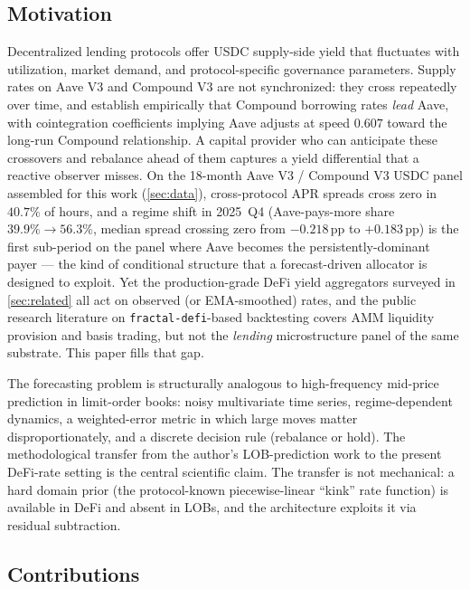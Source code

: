 \documentclass[11pt,a4paper]{article}
\begin{document}
\subsection{Motivation}
\label{sec:motivation}

Decentralized lending protocols offer USDC supply-side yield that
fluctuates with utilization, market demand, and protocol-specific
governance parameters. Supply rates on Aave V3 and Compound V3 are not
synchronized: they cross repeatedly over time, and
\cite{gudgeon2020defi} establish empirically that Compound borrowing
rates \emph{lead} Aave, with cointegration coefficients implying Aave
adjusts at speed $0.607$ toward the long-run Compound relationship.
A capital provider who can anticipate these crossovers and rebalance
ahead of them captures a yield differential that a reactive observer
misses. On the 18-month Aave V3 / Compound V3 USDC panel assembled for
this work (\cref{sec:data}), cross-protocol APR spreads cross zero in
$40.7\%$ of hours, and a regime shift in 2025~Q4 (Aave-pays-more share
$39.9\% \to 56.3\%$, median spread crossing zero from $-0.218$\,pp to
$+0.183$\,pp) is the first sub-period on the panel where Aave becomes
the persistently-dominant payer --- the kind of conditional structure
that a forecast-driven allocator is designed to exploit. Yet the
production-grade DeFi yield aggregators surveyed in \cref{sec:related}
all act on observed (or EMA-smoothed) rates, and the public research
literature on \texttt{fractal-defi}-based backtesting
\cite{urusov2024clmm,urusov2025dynlp,krestenko2026basis} covers AMM
liquidity provision and basis trading, but not the \emph{lending}
microstructure panel of the same substrate. This paper fills that gap.

The forecasting problem is structurally analogous to high-frequency
mid-price prediction in limit-order books: noisy multivariate time
series, regime-dependent dynamics, a weighted-error metric in which
large moves matter disproportionately, and a discrete decision rule
(rebalance or hold). The methodological transfer from the author's
LOB-prediction work \cite{solovev2026lob} to the present DeFi-rate
setting is the central scientific claim. The transfer is not
mechanical: a hard domain prior (the protocol-known piecewise-linear
``kink'' rate function) is available in DeFi and absent in LOBs, and
the architecture exploits it via residual subtraction.

\subsection{Contributions}
\label{sec:contributions}
\end{document}
